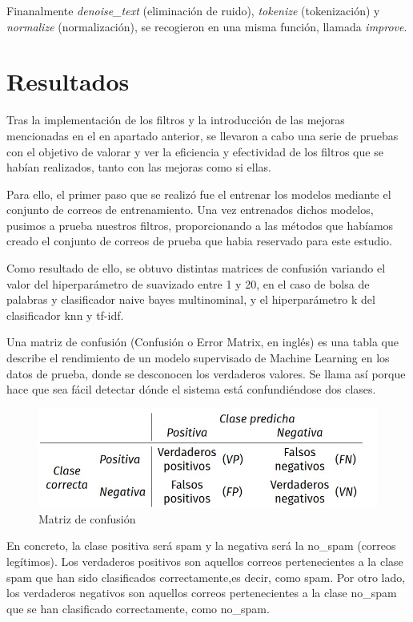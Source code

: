 \documentclass[conference,a4paper]{IEEEtran}
\begin{document}
Finanalmente \textit{denoise\_text} (eliminación de ruido), \textit{tokenize} (tokenización) y \textit{normalize} (normalización), se recogieron en una misma función, llamada \textit{improve}.


\section{Resultados}

Tras la implementación de los filtros y la introducción de las mejoras mencionadas en el en apartado anterior, se llevaron a cabo una serie de pruebas con el objetivo de valorar y ver la eficiencia y efectividad de los filtros que se habían realizados, tanto con las mejoras como si ellas. 

Para ello, el primer paso que se realizó fue el entrenar los modelos mediante el conjunto de correos de entrenamiento. Una vez entrenados dichos modelos, pusimos a prueba nuestros filtros, proporcionando a las métodos que habíamos creado el conjunto de correos de prueba que habia reservado para este estudio. 

 
Como resultado de ello, se obtuvo distintas matrices de confusión variando el valor del hiperparámetro de suavizado entre 1 y 20, en el caso de bolsa de palabras y clasificador naive bayes multinominal, y el hiperparámetro k del clasificador knn y tf-idf.

Una matriz de confusión (Confusión o Error Matrix, en inglés) es una tabla que  describe el rendimiento de un modelo supervisado de Machine Learning en los datos de prueba, donde se desconocen los verdaderos valores. Se llama así porque hace que sea fácil detectar dónde el sistema está confundiéndose dos clases.~\cite{b28}
\\

\begin{figure}[hbtp]
\centering
\includegraphics[scale=0.50]{matrix.jpg}
\caption{Matriz de confusión}
\end{figure}

En concreto, la clase positiva será spam y la negativa será la no\_spam (correos legítimos). Los verdaderos positivos son aquellos correos pertenecientes a la clase spam que han sido clasificados correctamente,es decir, como spam. Por otro lado, los verdaderos negativos son aquellos correos pertenecientes a la clase no\_spam que se han clasificado correctamente, como no\_spam.
\end{document}
